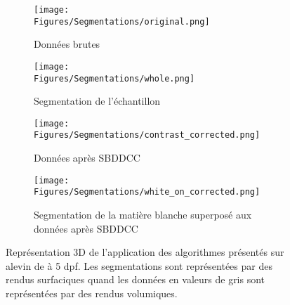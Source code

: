 \documentclass[\main/main.tex]{subfiles}
\begin{document}
\begin{figure}[htbp]
    \centering
    \begin{subfigure}[b]{\textwidth}
       \caption{
            \label{fig:lempereur_info:brut}
            Données brutes
            }
       \centering \texttt{[image: \\Figures/Segmentations/original.png]}
    \end{subfigure}
    \begin{subfigure}[b]{\textwidth}
       \caption{
        \label{fig:lempereur_info:whole}
        Segmentation de l'échantillon
        }
       \centering \texttt{[image: \\Figures/Segmentations/whole.png]}
    \end{subfigure}
    \begin{subfigure}[b]{\textwidth}
       \caption{
           \label{fig:lempereur_info:correction}
           Données après SBDDCC
        }
       \centering \texttt{[image: \\Figures/Segmentations/contrast\_corrected.png]}
    \end{subfigure}
    \begin{subfigure}[b]{\textwidth}
       \caption{
           \label{fig:lempereur_info:white}
            Segmentation de la matière blanche superposé aux données après SBDDCC
            }
       \centering \texttt{[image: \\Figures/Segmentations/white\_on\_corrected.png]}
    \end{subfigure}
    \caption{
        \label{fig:lempereur_info}
        Représentation 3D de l'application des algorithmes présentés sur alevin de \pz{} à 5 dpf. Les segmentations sont représentées par des rendus surfaciques quand les données en valeurs de gris sont représentées par des rendus volumiques.
    }
    
\end{figure}
\end{document}
